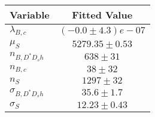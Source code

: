 \begin{tabular}[t]{lc}
\hline
Variable &Fitted Value\\
\hline\hline
$\lambda_{B,c}$&$(-0.0\pm4.3)e-07$\\
\hline
$\mu_S$&$5279.35\pm0.53$\\
\hline
$n_{B, D^* D_s h}$&$638\pm31$\\
\hline
$n_{B,c}$&$38\pm32$\\
\hline
$n_S$&$1297\pm32$\\
\hline
$\sigma_{B, D^* D_s h}$&$35.6\pm1.7$\\
\hline
$\sigma_S$&$12.23\pm0.43$\\
\hline
\end{tabular}